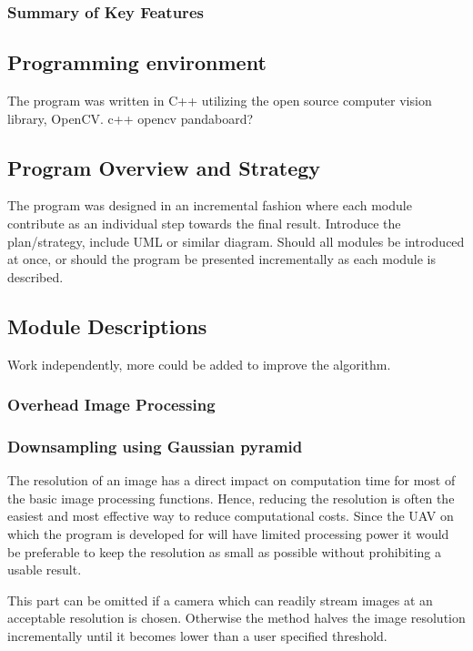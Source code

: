 \documentclass[a4paper,10pt]{article}
\begin{document}
	\subsubsection{Summary of Key Features}
	
    \subsection{Programming environment}
      The program was written in C++ utilizing the open source computer vision library, OpenCV. 
  c++ opencv pandaboard?
  \subsection{Program Overview and Strategy}
    The program was designed in an incremental fashion where each module contribute as an individual step towards the final result. 
  Introduce the plan/strategy, include UML or similar diagram. Should all modules be introduced at once, or should the program be presented incrementally as each module is described.
  \subsection{Module Descriptions}
  Work independently, more could be added to improve the algorithm.
    \subsubsection{Overhead Image Processing}
    \subsubsection{Downsampling using Gaussian pyramid}
      The resolution of an image has a direct impact on computation time for most of the basic image processing functions. Hence, reducing the resolution is often the easiest and most effective way to reduce computational costs. Since the UAV on which the program is developed for will have limited processing power it would be preferable to keep the resolution as small as possible without prohibiting a usable result.
      
      This part can be omitted if a camera which can readily stream images at an acceptable resolution is chosen. Otherwise the method halves the image resolution incrementally until it becomes lower than a user specified threshold.
      
\end{document}
